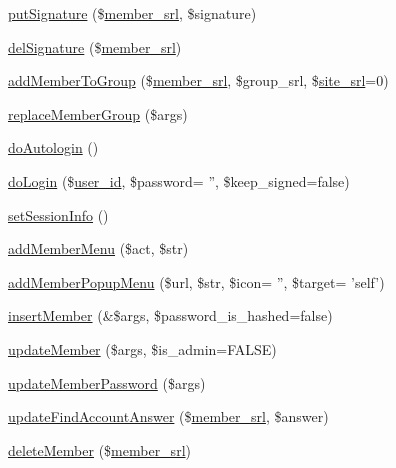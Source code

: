 \begin{DoxyCompactItemize}
\item 
\hyperlink{classmemberController_a084c3af4daea1a860f95e06f2bc5fc28}{put\-Signature} (\$\hyperlink{ko_8install_8php_aa61f9e08f0fe505094d26f8143f30bbd}{member\-\_\-srl}, \$signature)
\item 
\hyperlink{classmemberController_a0fa2ec662eb7a40333ca2049a103385e}{del\-Signature} (\$\hyperlink{ko_8install_8php_aa61f9e08f0fe505094d26f8143f30bbd}{member\-\_\-srl})
\item 
\hyperlink{classmemberController_aca7533f0e95df7227073436c24827c7b}{add\-Member\-To\-Group} (\$\hyperlink{ko_8install_8php_aa61f9e08f0fe505094d26f8143f30bbd}{member\-\_\-srl}, \$group\-\_\-srl, \$\hyperlink{ko_8install_8php_a8b1406b4ad1048041558dce6bfe89004}{site\-\_\-srl}=0)
\item 
\hyperlink{classmemberController_acc92443cdd02e55cec12099722482737}{replace\-Member\-Group} (\$args)
\item 
\hyperlink{classmemberController_aeb2590d01346c9a25c2b22f99429f6a3}{do\-Autologin} ()
\item 
\hyperlink{classmemberController_a92930ff9a5763ef9d6d292c7154269e4}{do\-Login} (\$\hyperlink{ko_8install_8php_a74f1a394389d774e5b4cd5d1d15413f7}{user\-\_\-id}, \$password= '', \$keep\-\_\-signed=false)
\item 
\hyperlink{classmemberController_ae4175b4a60e0b3000ed12e36508720ad}{set\-Session\-Info} ()
\item 
\hyperlink{classmemberController_aaa52725f8ba9ba16cfe4b350a51d7420}{add\-Member\-Menu} (\$act, \$str)
\item 
\hyperlink{classmemberController_a91303fbd27713d1990f88b8dd3c09b2b}{add\-Member\-Popup\-Menu} (\$url, \$str, \$icon= '', \$target= 'self')
\item 
\hyperlink{classmemberController_ae588324b8e86b9259e40d104b4d2b42d}{insert\-Member} (\&\$args, \$password\-\_\-is\-\_\-hashed=false)
\item 
\hyperlink{classmemberController_ac1ad3397eda0a695046b023a14d25496}{update\-Member} (\$args, \$is\-\_\-admin=F\-A\-L\-S\-E)
\item 
\hyperlink{classmemberController_aed05d2a367f7e7a5b70fcbd0b4a08e74}{update\-Member\-Password} (\$args)
\item 
\hyperlink{classmemberController_a18f38d5711817d623ff49800ad9a9292}{update\-Find\-Account\-Answer} (\$\hyperlink{ko_8install_8php_aa61f9e08f0fe505094d26f8143f30bbd}{member\-\_\-srl}, \$answer)
\item 
\hyperlink{classmemberController_a5170b3fafc449f4cc6fc599c093fcc06}{delete\-Member} (\$\hyperlink{ko_8install_8php_aa61f9e08f0fe505094d26f8143f30bbd}{member\-\_\-srl})

\end{DoxyCompactItemize}
